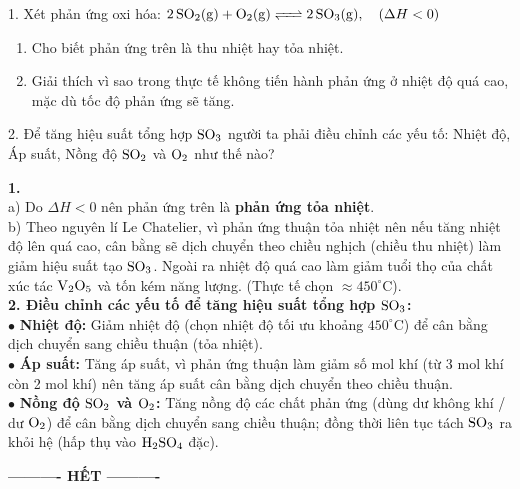 \documentclass[11pt,a4paper]{article}
\begin{document}
1. Xét phản ứng oxi hóa: $\ce{2SO2(g) + O2(g) <=> 2SO3(g)},\quad (\Delta H < 0)$
\begin{enumerate}[label=\alph*),leftmargin=20pt,itemsep=0pt]
\item Cho biết phản ứng trên là thu nhiệt hay tỏa nhiệt.
\item Giải thích vì sao trong thực tế không tiến hành phản ứng ở nhiệt độ quá cao, mặc dù tốc độ phản ứng sẽ tăng.
\end{enumerate}
2. Để tăng hiệu suất tổng hợp $\ce{SO3}$ người ta phải điều chỉnh các yếu tố: Nhiệt độ, Áp suất, Nồng độ $\ce{SO2}$ và $\ce{O2}$ như thế nào?

\begin{tcolorbox}[colback=white,colframe=solBlue,arc=2mm,boxrule=0.5pt,title=\textbf{Lời giải Câu 5 (Tự luận)}]
\textbf{1.} \\
a) Do $\Delta H < 0$ nên phản ứng trên là \textbf{phản ứng tỏa nhiệt}.\\
b) Theo nguyên lí Le Chatelier, vì phản ứng thuận tỏa nhiệt nên nếu tăng nhiệt độ lên quá cao, cân bằng sẽ dịch chuyển theo chiều nghịch (chiều thu nhiệt) làm giảm hiệu suất tạo $\ce{SO3}$. Ngoài ra nhiệt độ quá cao làm giảm tuổi thọ của chất xúc tác $\ce{V2O5}$ và tốn kém năng lượng. (Thực tế chọn $\approx 450^\circ\text{C}$).\\[4pt]
\textbf{2. Điều chỉnh các yếu tố để tăng hiệu suất tổng hợp $\ce{SO3}$:}\\
$\bullet$ \textbf{Nhiệt độ:} Giảm nhiệt độ (chọn nhiệt độ tối ưu khoảng $450^\circ\text{C}$) để cân bằng dịch chuyển sang chiều thuận (tỏa nhiệt).\\
$\bullet$ \textbf{Áp suất:} Tăng áp suất, vì phản ứng thuận làm giảm số mol khí (từ 3 mol khí còn 2 mol khí) nên tăng áp suất cân bằng dịch chuyển theo chiều thuận.\\
$\bullet$ \textbf{Nồng độ $\ce{SO2}$ và $\ce{O2}$:} Tăng nồng độ các chất phản ứng (dùng dư không khí / dư $\ce{O2}$) để cân bằng dịch chuyển sang chiều thuận; đồng thời liên tục tách $\ce{SO3}$ ra khỏi hệ (hấp thụ vào $\ce{H2SO4}$ đặc).
\end{tcolorbox}

\vspace{6pt}
\begin{center}
\textbf{\large ---------- HẾT ----------}
\end{center}
\end{document}
